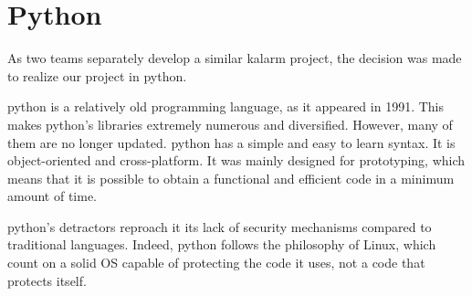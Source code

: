 \section{Python}

As two teams separately develop a similar \gls{kalarm} project, the decision was
made to realize our project in python.

\gls{python} is a relatively old programming language, as it appeared in 1991.
This makes \gls{python}'s libraries extremely numerous and diversified.
However, many of them are no longer updated. \gls{python} has a simple and easy
to learn syntax. It is object-oriented and cross-platform. It was mainly
designed for prototyping, which means that it is possible to obtain a functional
and efficient code in a minimum amount of time.

\gls{python}'s detractors reproach it its lack of security mechanisms compared
to traditional languages. Indeed, \gls{python} follows the philosophy of
Linux, which count on a solid OS capable of protecting the code it uses, not a
code that protects itself.
